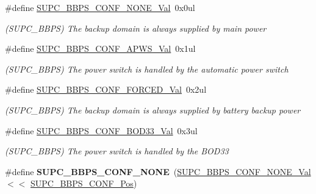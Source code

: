 \begin{DoxyCompactItemize}
\item 
\hypertarget{group___s_a_m_l21___s_u_p_c_ga9a7df2ff6f217661d96755af67321477}{}\#define \hyperlink{group___s_a_m_l21___s_u_p_c_ga9a7df2ff6f217661d96755af67321477}{S\+U\+P\+C\+\_\+\+B\+B\+P\+S\+\_\+\+C\+O\+N\+F\+\_\+\+N\+O\+N\+E\+\_\+\+Val}~0x0ul\label{group___s_a_m_l21___s_u_p_c_ga9a7df2ff6f217661d96755af67321477}

\begin{DoxyCompactList}\small\item\em (S\+U\+P\+C\+\_\+\+B\+B\+P\+S) The backup domain is always supplied by main power \end{DoxyCompactList}\item 
\hypertarget{group___s_a_m_l21___s_u_p_c_ga6bfc9d1bbb05be9033ff1af9955cb306}{}\#define \hyperlink{group___s_a_m_l21___s_u_p_c_ga6bfc9d1bbb05be9033ff1af9955cb306}{S\+U\+P\+C\+\_\+\+B\+B\+P\+S\+\_\+\+C\+O\+N\+F\+\_\+\+A\+P\+W\+S\+\_\+\+Val}~0x1ul\label{group___s_a_m_l21___s_u_p_c_ga6bfc9d1bbb05be9033ff1af9955cb306}

\begin{DoxyCompactList}\small\item\em (S\+U\+P\+C\+\_\+\+B\+B\+P\+S) The power switch is handled by the automatic power switch \end{DoxyCompactList}\item 
\hypertarget{group___s_a_m_l21___s_u_p_c_ga3385481afbf71b502d4177f93c2925ea}{}\#define \hyperlink{group___s_a_m_l21___s_u_p_c_ga3385481afbf71b502d4177f93c2925ea}{S\+U\+P\+C\+\_\+\+B\+B\+P\+S\+\_\+\+C\+O\+N\+F\+\_\+\+F\+O\+R\+C\+E\+D\+\_\+\+Val}~0x2ul\label{group___s_a_m_l21___s_u_p_c_ga3385481afbf71b502d4177f93c2925ea}

\begin{DoxyCompactList}\small\item\em (S\+U\+P\+C\+\_\+\+B\+B\+P\+S) The backup domain is always supplied by battery backup power \end{DoxyCompactList}\item 
\hypertarget{group___s_a_m_l21___s_u_p_c_ga4829c246da4871a2e4901ab004043caa}{}\#define \hyperlink{group___s_a_m_l21___s_u_p_c_ga4829c246da4871a2e4901ab004043caa}{S\+U\+P\+C\+\_\+\+B\+B\+P\+S\+\_\+\+C\+O\+N\+F\+\_\+\+B\+O\+D33\+\_\+\+Val}~0x3ul\label{group___s_a_m_l21___s_u_p_c_ga4829c246da4871a2e4901ab004043caa}

\begin{DoxyCompactList}\small\item\em (S\+U\+P\+C\+\_\+\+B\+B\+P\+S) The power switch is handled by the B\+O\+D33 \end{DoxyCompactList}\item 
\hypertarget{group___s_a_m_l21___s_u_p_c_gab808c73c5f679a4be6554f19e16eb765}{}\#define {\bfseries S\+U\+P\+C\+\_\+\+B\+B\+P\+S\+\_\+\+C\+O\+N\+F\+\_\+\+N\+O\+N\+E}~(\hyperlink{group___s_a_m_l21___s_u_p_c_ga9a7df2ff6f217661d96755af67321477}{S\+U\+P\+C\+\_\+\+B\+B\+P\+S\+\_\+\+C\+O\+N\+F\+\_\+\+N\+O\+N\+E\+\_\+\+Val}       $<$$<$ \hyperlink{group___s_a_m_l21___s_u_p_c_gafb7f9d16c3342e20e279e40f0c5a8d06}{S\+U\+P\+C\+\_\+\+B\+B\+P\+S\+\_\+\+C\+O\+N\+F\+\_\+\+Pos})\label{group___s_a_m_l21___s_u_p_c_gab808c73c5f679a4be6554f19e16eb765}


\end{DoxyCompactItemize}
